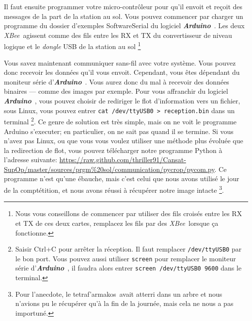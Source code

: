 \documentclass[twocolumn, 8pt]{article}
\newcommand\tet{\textgreek{tetraf'armakos}~}
\newcommand\Ard{\textbf{\emph{Arduino}}~}
\newcommand\XB{\emph{XBee}~}
\begin{document}
\par Il faut ensuite programmer votre micro-contrôleur pour qu'il envoit et reçoit des messages de la part de la station au sol. Vous pouvez commencer par charger un programme du dossier d'exemples \textsf{SoftwareSerial} du logiciel \Ard. Les deux \XB agissent comme des fils entre les RX et TX du convertisseur de niveau logique et le \emph{dongle} USB de la station au sol \footnote{Nous vous conseillons de commencer par utiliser des fils croisés entre les RX et TX de ces deux cartes, remplacez les fils par des \XB lorsque ça fonctionne.}
\par Vous savez maintenant communiquer sans-fil avec votre système. Vous pouvez donc recevoir les données qu'il vous envoit. Cependant, vous êtes dépendant du \textsf{moniteur série} d'\Ard. Vous aurez donc du mal à recevoir des données binaires --- comme des images par exemple. Pour vous affranchir du logiciel \Ard, vous pouvez choisir de rediriger le flot d'information vers un fichier, sous Linux, vous pouvez entrer \texttt{cat /dev/ttyUSB0 > reception.bin} dans un terminal \footnote{Saisir \textsf{Ctrl+C} pour arrêter la réception. Il faut remplacer \texttt{/dev/ttyUSB0} par le bon port. Vous pouvez aussi utiliser \texttt{screen} pour remplacer le \textsf{moniteur série} d'\Ard, il faudra alors entrer \texttt{screen /dev/ttyUSB0 9600} dans le terminal.}. Ce genre de solution est très simple, mais on ne voit le programme Arduino s'executer; en particulier, on ne sait pas quand il se termine. Si vous n'avez pas Linux, ou que vous vous voulez utiliser une méthode plus évoluée que la redirection de flot, vous pouvez télécharger notre programme Python à l'adresse suivante: \url{https://raw.github.com/thriller91/Cansat-SupOp/master/sources/prgm\%20sol/communication/pycrop/pycom.py}. Ce programme n'est qu'une ébauche, mais c'est celui que nous avons utilisé le jour de la comptétition, et nous avons réussi à récupérer notre image intacte \footnote{Pour l'anecdote, le \tet avait atterri dans un arbre et nous n'avions pu le récupérer qu'à la fin de la journée, mais cela ne nous a pas importuné.}.
\end{document}
